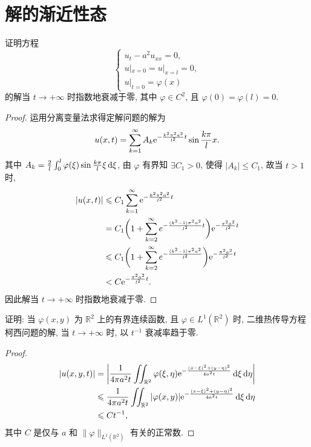 \newpage
\section{解的渐近性态}

\begin{exercise}
  证明方程
  \[\begin{cases}
    u_t - a^2 u_{xx} = 0, \\
    u|_{x=0} = u|_{x=l} = 0, \\
    u|_{t=0} = \varphi(x)
  \end{cases}\]
  的解当 $t\to +\infty$ 时指数地衰减于零, 其中 $\varphi\in C^2$,
  且 $\varphi(0) = \varphi(l) = 0$.
\end{exercise}

\begin{proof}
  运用分离变量法求得定解问题的解为
  \[u(x,t) = \sum_{k=1}^{\infty} A_k \mathrm{e}^{-\frac{k^2\pi^2a^2}{l^2}t}\sin\frac{k\pi}{l}x.\]
  其中 $A_k=\frac{2}{l} \int_0^l \varphi(\xi) \sin\frac{k\pi}{l}\xi\mathop{}\!\mathrm{d}\xi$,
  由 $\varphi$ 有界知 $\exists C_1>0$, 使得 $|A_k|\leq C_1$, 故当 $t>1$ 时,
  \[\begin{split}
  |u(x,t)|
  & \leqslant C_1\sum_{k=1}^{\infty} \mathrm{e}^{-\frac{k^2\pi^2a^2}{l^2}t} \\
  & = C_1\biggl(1+\sum_{k=2}^{\infty}e^{-\frac{(k^2-1)\pi^2a^2}{l^2}t}\biggr)
      \mathrm{e}^{-\frac{\pi^2a^2}{l^2}t} \\
  & \leqslant C_1\biggl(1+\sum_{k=2}^{\infty}e^{-\frac{(k^2-1)\pi^2a^2}{l^2}}\biggr)
      \mathrm{e}^{-\frac{\pi^2a^2}{l^2}t} \\
  & < C\mathrm{e}^{-\frac{\pi^2a^2}{l^2}t}.
  \end{split}\]
  因此解当 $t\to+\infty$ 时指数地衰减于零.
\end{proof}


\begin{exercise}
  证明: 当 $\varphi(x,y)$ 为 $\mathbb{R}^2$ 上的有界连续函数, 且 $\varphi\in L^1(\mathbb{R}^2)$
  时, 二维热传导方程柯西问题的解, 当 $t\to +\infty$ 时, 以 $t^{-1}$ 衰减率趋于零.
\end{exercise}

\begin{proof}
  \[\begin{split}
    |u(x,y,t)|
    & = \left|\frac{1}{4\pi a^2t} \iint_{\mathbb{R}^2} \varphi(\xi,\eta)
        \mathrm{e}^{-\frac{(x-\xi)^2+(y-\eta)^2}{4a^2t}}\mathop{}\!\mathrm{d}\xi\mathop{}\!\mathrm{d}\eta\right| \\
    & \leqslant \frac{1}{4\pi a^2t} \iint_{\mathbb{R}^2} |\varphi(x,y)|
        \mathrm{e}^{-\frac{(x-\xi)^2+(y-\eta)^2}{4a^2t}}\mathop{}\!\mathrm{d}\xi\mathop{}\!\mathrm{d}\eta \\
    & \leqslant Ct^{-1},
  \end{split}\]
  其中 $C$ 是仅与 $a$ 和 $\|\varphi\|_{L^1(\mathbb{R}^2)}$ 有关的正常数.
\end{proof}